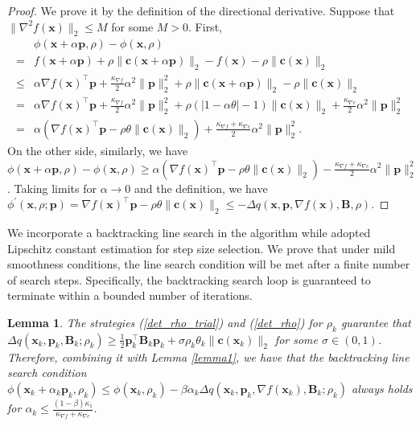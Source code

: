 \documentclass[aos]{imsart}
\numberwithin{equation}{section}
\theoremstyle{plain}
\newtheorem{lemma}{Lemma}
\begin{document}
\begin{appendix}
 \begin{proof}
     We prove it by the definition of the directional derivative. Suppose that $\|\nabla^2 f(\bm{x})\|_2 \leq M$ for some $M>0$. First, 
     \begin{equation}
     \label{eq1}
         \begin{split}
             & \phi(\bm{x}+\alpha \bm{p},\rho) - \phi(\bm{x},\rho) \\
             = & f(\bm{x}+ \alpha \bm{p}) + \rho \|\bm{c}(\bm{x}+\alpha \bm{p})\|_2 - f(\bm{x}) -  \rho \|\bm{c}(\bm{x})\|_2 \\
             \leq & \alpha \nabla f(\bm{x})^{\top} \bm{p} + \frac{\kappa_{\nabla f}}{2} \alpha^2 \|\bm{p}\|_2^2 + \rho \|\bm{c}(\bm{x}+\alpha \bm{p})\|_2 - \rho \|\bm{c}(\bm{x})\|_2\\
             = &  \alpha \nabla f(\bm{x})^{\top} \bm{p} + \frac{\kappa_{\nabla f}}{2} \alpha^2 \|\bm{p}\|_2^2 + \rho \left( \left| 1- \alpha \theta \right| - 1 \right) \|\bm{c}(\bm{x})\|_2 + \frac{\kappa_{\nabla c}}{2}\alpha^2 \|\bm{p}\|_2^2\\
             = & \alpha \left(\nabla f(\bm{x})^{\top} \bm{p} - \rho \theta \|\bm{c}(\bm{x})\|_2 \right) + \frac{\kappa_{\nabla f}+\kappa_{\nabla c}}{2} \alpha^2 \|\bm{p}\|_2^2.
         \end{split}
     \end{equation}
     On the other side, similarly, we have $\phi(\bm{x}+\alpha \bm{p},\rho) - \phi(\bm{x},\rho) \geq \alpha \left(\nabla f(\bm{x})^{\top} \bm{p} - \rho \theta \|\bm{c}(\bm{x})\|_2 \right) - \frac{\kappa_{\nabla f}+\kappa_{\nabla c}}{2} \alpha^2 \|\bm{p}\|_2^2$. Taking limits for $\alpha \to 0$ and the definition, we have $\phi^{\prime}(\bm{x},\rho;\bm{p})  = \nabla f(\bm{x})^{\top} \bm{p} - \rho \theta \|\bm{c}(\bm{x})\|_2 \leq -\Delta q(\bm{x},\bm{p},\nabla f(\bm{x}),\bm{B},\rho)$.
 \end{proof}


We incorporate a backtracking line search in the algorithm while \cite{berahas2021sequential} adopted Lipschitz constant estimation for step size selection. We prove that under mild smoothness conditions, the line search condition will be met after a finite number of search steps. Specifically, the backtracking search loop is guaranteed to terminate within a bounded number of iterations.
 \begin{lemma}
 \label{lemma2}
     The strategies (\ref{det_rho_trial}) and (\ref{det_rho}) for $\rho_k$ guarantee that $\Delta q(\bm{x}_k,\bm{p}_k,\bm{B}_k;\rho_k) \geq \frac{1}{2} \bm{p}_k^{\top} \bm{B}_k \bm{p}_k + \sigma \rho_k \theta_k \|\bm{c}(\bm{x}_k)\|_2$ for some $\sigma \in (0,1)$. Therefore, combining it with Lemma \ref{lemma1}, we have that the backtracking line search condition $\phi(\bm{x}_k+\alpha_k\bm{p}_k,\rho_k) \leq \phi(\bm{x}_k,\rho_k) - \beta \alpha_k \Delta q(\bm{x}_k,\bm{p}_k,\nabla f(\bm{x}_k),\bm{B}_k;\rho_k)$ always holds for $\alpha_k \leq \frac{(1-\beta)\kappa_1}{\kappa_{\nabla f}+\kappa_{\nabla c}}$.
 \end{lemma}


\end{appendix}
\end{document}
